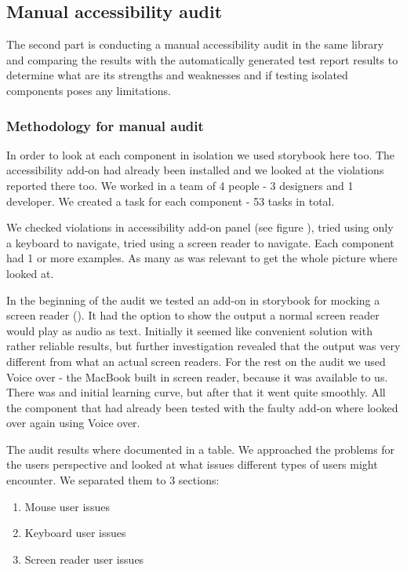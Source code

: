 \documentclass{master_thesis}
\begin{document}
\subsection{Manual accessibility audit}

The second part is conducting a manual accessibility audit in the same library and comparing the results with the automatically generated test report results to determine what are its strengths and weaknesses and if testing isolated components poses any limitations.
\subsubsection{Methodology for manual audit}
In order to look at each component in isolation we used storybook here too. The accessibility add-on had already been installed and we looked at the violations reported there too. We worked in a team of 4 people - 3 designers and 1 developer. We created a task for each component - 53 tasks in total.

We checked violations in accessibility add-on panel (see figure ), tried using only a keyboard to navigate, tried using a screen reader to navigate. Each component had 1 or more examples. As many as was relevant to get the whole picture where looked at.

In the beginning of the audit we tested an add-on in storybook for mocking a screen reader (). It had the option to show the output a normal screen reader would play as audio as text. Initially it seemed like convenient solution with rather reliable results, but further investigation revealed that the output was very different from what an actual screen readers. For the rest on the audit we used Voice over - the MacBook built in screen reader, because it was available to us. There was and initial learning curve, but after that it went quite smoothly. All the component that had already been tested with the faulty add-on where looked over again using Voice over.

The audit results where documented in a table. We approached the problems for the users perspective and looked at what issues different types of users might encounter. We separated them to 3 sections:
\begin{enumerate}
	\item Mouse user issues
	\item Keyboard user issues
	\item Screen reader user issues
\end{enumerate}
\end{document}
